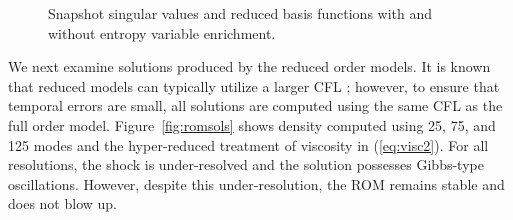 \documentclass[preprint,10pt]{elsarticle}
\theoremstyle{definition}
\theoremstyle{lemma}
\theoremstyle{theorem}
\theoremstyle{assumption}
\begin{document}
\begin{figure}
\centering
{}
\hspace{.02em}
\hspace{.02em}
\caption{Snapshot singular values and reduced basis functions with and without entropy variable enrichment. }
\label{fig:svd}
\end{figure}

We next examine solutions produced by the reduced order models.  It is known that reduced models can typically utilize a larger CFL \cite{lucia2004reduced, knezevic2011reduced}; however, to ensure that temporal errors are small, all solutions are computed using the same CFL as the full order model.  Figure~\ref{fig:romsols} shows density computed using 25, 75, and 125 modes and the hyper-reduced treatment of viscosity in (\ref{eq:visc2}).  For all resolutions, the shock is under-resolved and the solution possesses Gibbs-type oscillations.  However, despite this under-resolution, the ROM remains stable and does not blow up.  
\end{document}
